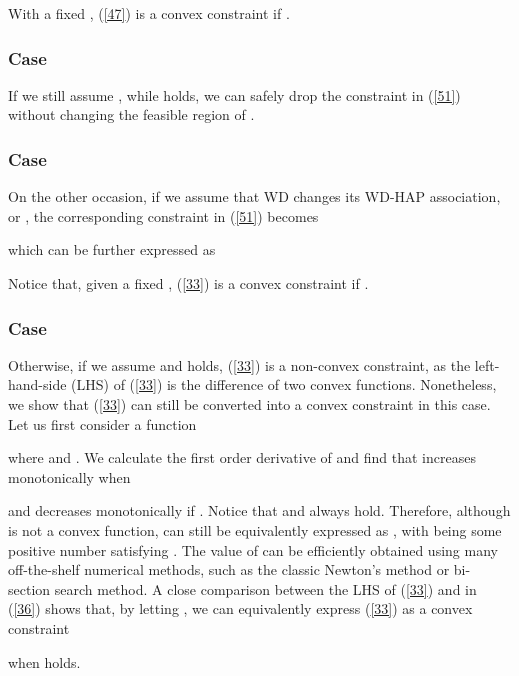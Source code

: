 \documentclass[journal, draftcls, one column, 12pt]{IEEEtran}
\begin{document}
With a fixed , (\ref{47}) is a convex constraint if .

\subsubsection{Case } If we still assume , while  holds, we can safely drop the constraint in (\ref{51}) without changing the feasible region of .

\subsubsection{Case } On the other occasion, if we assume that WD  changes its WD-HAP association, or , the corresponding constraint in (\ref{51}) becomes

which can be further expressed as

Notice that, given a fixed , (\ref{33}) is a convex constraint if .

\subsubsection{Case }
Otherwise, if we assume  and  holds, (\ref{33}) is a non-convex constraint, as the left-hand-side (LHS) of (\ref{33}) is the difference of two convex functions. Nonetheless, we show that (\ref{33}) can still be converted into a convex constraint in this case. Let us first consider a function

where  and . We calculate the first order derivative of  and find that  increases monotonically when

and decreases monotonically if . Notice that  and  always hold. Therefore, although  is not a convex function,  can still be equivalently expressed as , with  being some positive number satisfying . The value of  can be efficiently obtained using many off-the-shelf numerical methods, such as the classic Newton's method or bi-section search method. A close comparison between the LHS of (\ref{33}) and  in (\ref{36}) shows that, by letting , we can equivalently express (\ref{33}) as a convex constraint

when  holds.
\end{document}

